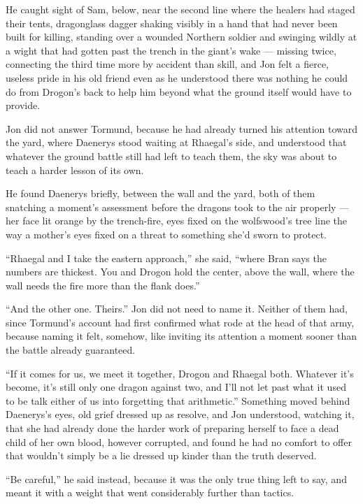 He caught sight of Sam, below, near the second line where the healers had staged their tents, dragonglass dagger shaking visibly in a hand that had never been built for killing, standing over a wounded Northern soldier and swinging wildly at a wight that had gotten past the trench in the giant’s wake — missing twice, connecting the third time more by accident than skill, and Jon felt a fierce, useless pride in his old friend even as he understood there was nothing he could do from Drogon’s back to help him beyond what the ground itself would have to provide.

Jon did not answer Tormund, because he had already turned his attention toward the yard, where Daenerys stood waiting at Rhaegal’s side, and understood that whatever the ground battle still had left to teach them, the sky was about to teach a harder lesson of its own.

\sceneBreak

He found Daenerys briefly, between the wall and the yard, both of them snatching a moment’s assessment before the dragons took to the air properly — her face lit orange by the trench-fire, eyes fixed on the wolfswood’s tree line the way a mother’s eyes fixed on a threat to something she’d sworn to protect.

“Rhaegal and I take the eastern approach,” she said, “where Bran says the numbers are thickest. You and Drogon hold the center, above the wall, where the wall needs the fire more than the flank does.”

“And the other one. Theirs.” Jon did not need to name it. Neither of them had, since Tormund’s account had first confirmed what rode at the head of that army, because naming it felt, somehow, like inviting its attention a moment sooner than the battle already guaranteed.

“If it comes for us, we meet it together, Drogon and Rhaegal both. Whatever it’s become, it’s still only one dragon against two, and I’ll not let past what it used to be talk either of us into forgetting that arithmetic.” Something moved behind Daenerys’s eyes, old grief dressed up as resolve, and Jon understood, watching it, that she had already done the harder work of preparing herself to face a dead child of her own blood, however corrupted, and found he had no comfort to offer that wouldn’t simply be a lie dressed up kinder than the truth deserved.

“Be careful,” he said instead, because it was the only true thing left to say, and meant it with a weight that went considerably further than tactics.

